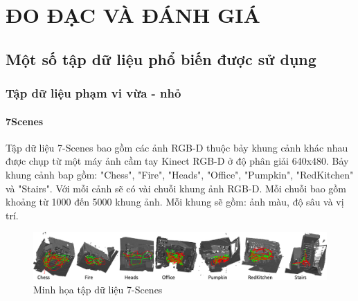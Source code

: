 \chapter{ĐO ĐẠC VÀ ĐÁNH GIÁ}

\section{Một số tập dữ liệu phổ biến được sử dụng}
\subsection{Tập dữ liệu phạm vi vừa - nhỏ}
\subsubsection*{7Scenes}
Tập dữ liệu 7-Scenes \cite{6619221} bao gồm các ảnh RGB-D thuộc bảy khung cảnh khác nhau được chụp từ một máy ảnh cầm tay Kinect RGB-D ở độ phân giải 640x480. Bảy khung cảnh bap gồm: "Chess", "Fire", "Heads", "Office", "Pumpkin", "RedKitchen" và "Stairs". Với mỗi cảnh sẽ có vài chuỗi khung ảnh RGB-D. Mỗi chuỗi bao gồm khoảng từ 1000 đến 5000 khung ảnh. Mỗi khung sẽ gồm: ảnh màu, độ sâu và vị trí.
\begin{figure}[H]
	\centering
	\includegraphics[width=\textwidth]{pics/Chapter2/7scenes.png}
	\caption{Minh họa tập dữ liệu 7-Scenes \cite{6619221}}
\end{figure}
